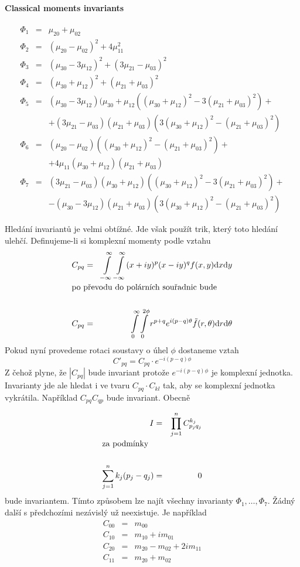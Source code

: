 \paragraph{Classical moments invariants}
\begin{eqnarray}
\Phi_1&=&\mu_{20}+\mu_{02}\\
\Phi_2&=&(\mu_{20}-\mu_{02})^2+4\mu^2_{11}\\
\Phi_3&=&(\mu_{30}-3\mu_{12})^2+(3\mu_{21}-\mu_{03})^2\\
\Phi_4&=&(\mu_{30}+\mu_{12})^2+(\mu_{21}+\mu_{03})^2\\
\Phi_5&=&(\mu_{30}-3\mu_{12})(\mu_{30}+\mu_{12}((\mu_{30}+\mu_{12})^2-3(\mu_{21}+\mu_{03})^2)+\nonumber\\
&&+(3\mu_{21}-\mu_{03})(\mu_{21}+\mu_{03})(3(\mu_{30}+\mu_{12})^2-(\mu_{21}+\mu_{03})^2)\\
\Phi_6&=&(\mu_{20}-\mu_{02})((\mu_{30}+\mu_{12})^2-(\mu_{21}+\mu_{03})^2)+\nonumber\\
&&+4\mu_{11}(\mu_{30}+\mu_{12})(\mu_{21}+\mu_{03})\\
\Phi_7&=&(3\mu_{21}-\mu_{03})(\mu_{30}+\mu_{12})((\mu_{30}+\mu_{12})^2-3(\mu_{21}+\mu_{03})^2)+\nonumber\\
&&-(\mu_{30}-3\mu_{12})(\mu_{21}+\mu_{03})(3(\mu_{30}+\mu_{12})^2-(\mu_{21}+\mu_{03})^2)
\end{eqnarray}

Hledání invariantů je velmi obtížné. Jde však použít trik, který toto hledání ulehčí.
Definujeme-li si komplexní momenty podle vztahu
\begin{eqnarray}
C_{pq}&=&\int\limits_{-\infty}^\infty\int\limits_{-\infty}^\infty(x+iy)^p(x-iy)^q f(x,y)\d x\d y\\
\noalign{\hbox{po převodu do polárních souřadnic bude}\nonumber}\\
C_{pq}&=&\int\limits_0^\infty\int\limits_0^{2\phi}r^{p+q}e^{i(p-q)\theta}\tilde{f}(r,\theta)\d r\d \theta
\end{eqnarray}
\noindent Pokud nyní provedeme rotaci soustavy o úhel $\phi$ dostaneme vztah
\begin{equation}
{C'}_{pq}=C_{pq}\cdot e^{-i(p-q)\phi}
\end{equation}
\noindent Z čehož plyne, že $|C_{pq}|$ bude invariant protože $e^{-i(p-q)\phi}$ je komplexní jednotka.
Invarianty jde ale hledat i ve tvaru $C_{pq}\cdot C_{kl}$ tak, aby se komplexní jednotka vykrátila.
Například $C_{pq}C_{qp}$ bude invariant. Obecně

\begin{eqnarray}
I&=&\prod\limits_{j=1}^nC_{p_jq_j}^{k_j}\\
\noalign{\hbox{za podmínky}\nonumber}\\
\sum\limits_{j=1}^nk_j(p_j-q_j)&=&0
\end{eqnarray}
\noindent bude invariantem. Tímto způsobem lze najít všechny invarianty $\Phi_1,\dots,\Phi_7$.
Žádný další s předchozími nezávislý už neexistuje. Je například
\begin{eqnarray}
C_{00}&=&m_{00}\\
C_{10}&=&m_{10}+im_{01}\\
C_{20}&=&m_{20}-m_{02}+2im_{11}\\
C_{11}&=&m_{20}+m_{02}
\end{eqnarray}

